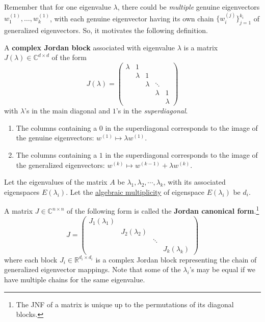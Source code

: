 	Remember that for one eigenvalue $\lambda$, there could be \textit{multiple} genuine eigenvectors $w_1^{(1)}, \ldots, w_k^{(1)}$, with each genuine eigenvector having its own chain $\{w_i^{(j)}\}_{j=1}^{k_i}$ of generalized eigenvectors. So, it motivates the following definition. 

	\begin{definition}
	  \label{def:complex-jordan-block-for-complex-eigenvalue}
		A \textbf{complex Jordan block} associated with eigenvalue $\lambda$ is a matrix $J(\lambda) \in \mathbb{C}^{d \times d}$ of the form 
		\begin{equation}
			J(\lambda) = \begin{pmatrix}
				\lambda & 1 &  & & \\
				& \lambda & 1 & & \\
				& & \lambda & \ddots & \\
				& & & \lambda & 1 \\
				& & & & \lambda
			\end{pmatrix}
		\end{equation}
		with $\lambda$'s in the main diagonal and $1$'s in the \textit{superdiagonal}. 
		\begin{enumerate}
			\item The columns containing a $0$ in the superdiagonal corresponds to the image of the genuine eigenvectors: $w^{(1)} \mapsto \lambda w^{(1)}$. 
			\item The columns containing a $1$ in the superdiagonal corresponds to the image of the generalized eigenvectors: $w^{(k)} \mapsto w^{(k-1)} + \lambda w^{(k)}$. 
		\end{enumerate}
	\end{definition}

	Let the eigenvalues of the matrix $A$ be $\lambda_1, \lambda_2, \cdots, \lambda_k$, with its associated eigenspaces $E(\lambda_i)$. Let the \hyperref[def:algebraic-multiplicity]{algebraic multiplicity} of eigenspace $E(\lambda_i)$ be $d_i$. 

	\begin{definition}
	  \label{def:jordan-canonical-form-over-c}
		A matrix $J \in \mathbb{C}^{n \times n}$ of the following form is called the \textbf{Jordan canonical form}.\footnote{The JNF of a matrix is unique up to the permutations of its diagonal blocks. }
		\begin{equation}
			J = \begin{pmatrix} J_1(\lambda_1) & & & \\  & J_2 (\lambda_2) & & \\  & &\ddots& \\  & & & J_k (\lambda_k) \end{pmatrix}
		\end{equation}
		where each block $J_i \in \mathbb{R}^{d_i \times d_i}$ is a complex Jordan block representing the chain of generalized eigenvector mappings. Note that some of the $\lambda_i$'s may be equal if we have multiple chains for the same eigenvalue. 
	\end{definition}

